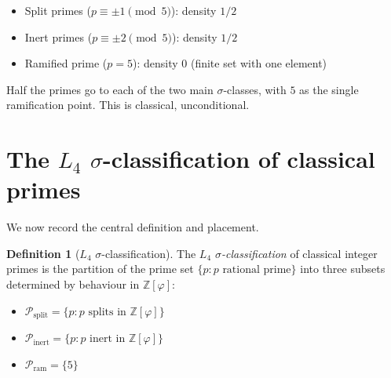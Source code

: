 \documentclass[11pt,a4paper]{article}
\theoremstyle{definition}
\newtheorem{definition}[theorem]{Definition}
\theoremstyle{remark}
\begin{document}
\begin{itemize}\itemsep0pt
  \item Split primes ($p \equiv \pm 1 \pmod{5}$): density $1/2$
  \item Inert primes ($p \equiv \pm 2 \pmod{5}$): density $1/2$
  \item Ramified prime ($p = 5$): density $0$ (finite set with one element)
\end{itemize}

Half the primes go to each of the two main $\sigma$-classes, with $5$
as the single ramification point. This is classical, unconditional.

\section{The $L_4$ $\sigma$-classification of classical primes}\label{sec:L4}

We now record the central definition and placement.

\begin{definition}[$L_4$ $\sigma$-classification]\label{def:L4_classification}
The \emph{$L_4$ $\sigma$-classification} of classical integer primes is
the partition of the prime set $\{p : p \text{ rational prime}\}$ into
three subsets determined by behaviour in $\mathbb{Z}[\varphi]$:
\begin{itemize}\itemsep0pt
  \item $\mathcal{P}_{\mathrm{split}} = \{p : p \text{ splits in } \mathbb{Z}[\varphi]\}$
  \item $\mathcal{P}_{\mathrm{inert}} = \{p : p \text{ inert in } \mathbb{Z}[\varphi]\}$
  \item $\mathcal{P}_{\mathrm{ram}} = \{5\}$
\end{itemize}
\end{definition}
\end{document}
